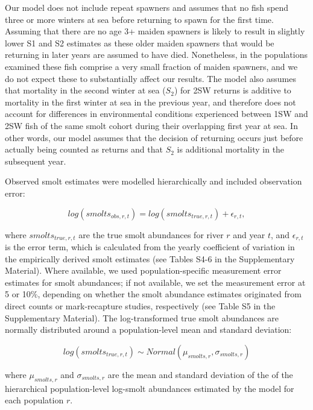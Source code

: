 \documentclass[12pt]{article}
\newcommand{\St}{$S_{2}$\xspace}
\newcommand{\comment}[1]{\par {\bfseries \color{blue} #1 \par}} %
\begin{document}
Our model does not include repeat spawners and assumes that no fish spend
three or more winters at sea before returning to spawn for the first time.
Assuming that there are no age 3+ maiden spawners is likely to result in
slightly lower S1 and S2 estimates as these older maiden spawners that would
be returning in later years are assumed to have died. Nonetheless, in the
populations examined these fish comprise a very small fraction of maiden spawners,
and we do not expect these to substantially affect our results.
The model also assumes that mortality in the second winter at sea (\St) for 2SW returns
is additive to mortality in the first winter at sea in the previous year,
and therefore does not account for differences in environmental conditions experienced
between 1SW and 2SW fish of the same smolt cohort during their overlapping first year at sea.
In other words, our model assumes that the decision of returning occurs just before
actually being counted as returns and that \St is additional mortality in
the subsequent year.


Observed smolt estimates were modelled hierarchically and included
observation error:

\begin{equation}
log(smolts_{obs,r,t}) = log(smolts_{true,r,t}) + \epsilon_{r,t},
\end{equation}

where $smolts_{true,r,t}$ are the true smolt abundances for river
$r$ and year $t$, and $\epsilon_{r,t}$ is the error term, which is calculated from the yearly
coefficient of variation in the empirically derived
smolt estimates (see Tables S4-6 in the Supplementary Material).
Where available, we used population-specific measurement error estimates for smolt abundances; if not
available, we set the measurement error at 5 or 10\%, depending on whether the smolt
abundance estimates originated from direct counts or mark-recapture studies, respectively
(see Table S5 in the Supplementary Material).
The log-transformed true smolt abundances are
normally distributed around a population-level mean and standard deviation:

\begin{equation}
log(smolts_{true,r,t}) \sim Normal(\mu_{smolts,r}, \sigma_{smolts,r})
\end{equation}

where $\mu_{smolts,r}$ and $\sigma_{smolts,r}$ are the mean and standard
deviation of the of the hierarchical population-level log-smolt abundances
estimated by the model for each population $r$.
\end{document}
